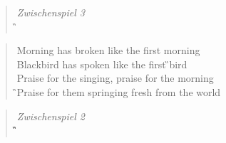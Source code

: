 \documentclass[8pt,a4paper,oneside, onecolumn]{article}
\begin{document}
\begin{multicols}{2}
\begin{verse}
\textit{Zwischenspiel 3}\\
\G{}\qquad \A{}\qquad \Fis{}\qquad \Hm{}\qquad \Gs{}\qquad \C{}\qquad \F{}\qquad \C{}\\
\end{verse}


\begin{verse}
Morning has \C{}bro\Dm{}ken \Gs{}like the first \F{}mor\C{}ning\\
Blackbird has \Em{}spo\Am{}ken like the first \G{}bird \Gs{}\\
\C{}Praise for the \F{}singing, \C{}praise for the \Am{}mor\D{}ning \\
\G{}Praise for them \C{}spring\F{}ing \Gs{}fresh from the \C{}world  \\
\end{verse}

\begin{verse}
\textit{Zwischenspiel 2}\\
\F{}\qquad \G{}\qquad \E{}\qquad \Am{}\qquad \G{}\qquad \Fis{}\qquad \Hm{}\qquad \G{}\qquad \D{}\qquad \A{}\qquad \D{}\\
\end{verse}

\end{multicols}
\end{document}
